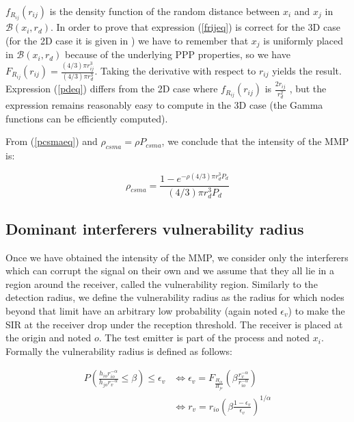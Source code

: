 \documentclass{sig-alternate-05-2015}
\begin{document}
$f_{R_{ij}}(r_{ij})$ is the density function of the random distance between $x_i$ and $x_j$ in $\mathcal{B}(x_i,r_d)$. In order to prove that expression (\ref{frijeq}) is correct for the 3D case (for the 2D case it is given in \cite{sousa90}) we have to remember that $x_j$ is uniformly placed in $\mathcal{B}(x_i,r_d)$ because of the underlying PPP properties, so we have $F_{R_{ij}}(r_{ij})=\frac{(4/3)\pi r_{ij}^3}{(4/3)\pi r_d^3}$. Taking the derivative with respect to $r_{ij}$ yields the result. Expression (\ref{pdeq}) differs from the 2D case where $f_{R_{ij}}(r_{ij})$ is $\frac{2 r_{ij}}{r_d^2}$ \cite{sousa90}, but the expression remains reasonably easy to compute in the 3D case (the Gamma functions can be efficiently computed).

From (\ref{pcsmaeq}) and $\rho_{csma}=\rho P_{csma}$, we conclude that the intensity of the MMP is:

\begin{equation}
 \rho_{csma}=\frac{1-e^{-\rho (4/3) \pi r_d^3 P_d}}{(4/3) \pi r_d^3 P_d}
 \label{rcsmaeq}
\end{equation}

\subsection{Dominant interferers vulnerability radius}

Once we have obtained the intensity of the MMP, we consider only the interferers which can corrupt the signal on their own and we assume that they all lie in a region around the receiver, called the vulnerability region. Similarly to the detection radius, we define the vulnerability radius as the radius for which nodes beyond that limit have an arbitrary low probability (again noted $\epsilon_v$) to make the SIR at the receiver drop under the reception threshold. The receiver is placed at the origin and noted $o$. The test emitter is part of the process and noted $x_i$. Formally the vulnerability radius is defined as follows:

\begin{align}
 P\left( \frac{h_{io} r_{io}^{-\alpha}}{h_{jo} r_{v}^{-\alpha}}\leq \beta\right)\leq \epsilon_v & \Leftrightarrow \epsilon_v = F_{\frac{H_{io}}{H_{jo}}}\left(\beta \frac{r_v^{-\alpha}}{r_{io}^{-\alpha}} \right)\nonumber\\
 & \Leftrightarrow r_v=r_{io}\left(\beta \frac{1- \epsilon_v}{\epsilon_v} \right)^{1/\alpha}
\end{align}
\end{document}
